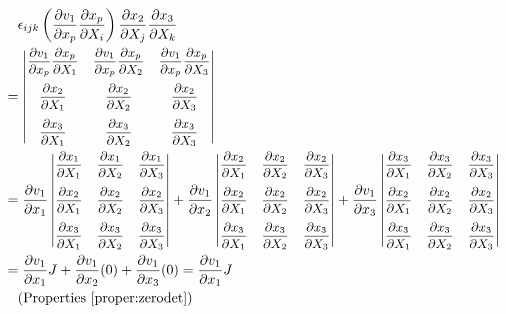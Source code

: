 \begin{align*}
&\quad\epsilon_{ijk} \left(\frac{\partial v_1}{\partial x_p}\frac{\partial x_p}{\partial X_i}\right)\frac{\partial x_2}{\partial X_j}\frac{\partial x_3}{\partial X_k} \\
&= \small\begin{vmatrix}
\dfrac{\partial v_1}{\partial x_p}\dfrac{\partial x_p}{\partial X_1} & \dfrac{\partial v_1}{\partial x_p}\dfrac{\partial x_p}{\partial X_2} & \dfrac{\partial v_1}{\partial x_p}\dfrac{\partial x_p}{\partial X_3} \\[10pt]
\dfrac{\partial x_2}{\partial X_1} & \dfrac{\partial x_2}{\partial X_2} & \dfrac{\partial x_2}{\partial X_3} \\[10pt]
\dfrac{\partial x_3}{\partial X_1} & \dfrac{\partial x_3}{\partial X_2} & \dfrac{\partial x_3}{\partial X_3} 
\end{vmatrix} \\
&= \frac{\partial v_1}{\partial x_1}\small\begin{vmatrix}
\dfrac{\partial x_1}{\partial X_1} & \dfrac{\partial x_1}{\partial X_2} & \dfrac{\partial x_1}{\partial X_3} \\[10pt]
\dfrac{\partial x_2}{\partial X_1} & \dfrac{\partial x_2}{\partial X_2} & \dfrac{\partial x_2}{\partial X_3} \\[10pt]
\dfrac{\partial x_3}{\partial X_1} & \dfrac{\partial x_3}{\partial X_2} & \dfrac{\partial x_3}{\partial X_3} 
\end{vmatrix} +
\frac{\partial v_1}{\partial x_2}\small\begin{vmatrix}
\dfrac{\partial x_2}{\partial X_1} & \dfrac{\partial x_2}{\partial X_2} & \dfrac{\partial x_2}{\partial X_3} \\[10pt]
\dfrac{\partial x_2}{\partial X_1} & \dfrac{\partial x_2}{\partial X_2} & \dfrac{\partial x_2}{\partial X_3} \\[10pt]
\dfrac{\partial x_3}{\partial X_1} & \dfrac{\partial x_3}{\partial X_2} & \dfrac{\partial x_3}{\partial X_3} 
\end{vmatrix} +
\frac{\partial v_1}{\partial x_3}\small\begin{vmatrix}
\dfrac{\partial x_3}{\partial X_1} & \dfrac{\partial x_3}{\partial X_2} & \dfrac{\partial x_3}{\partial X_3} \\[10pt]
\dfrac{\partial x_2}{\partial X_1} & \dfrac{\partial x_2}{\partial X_2} & \dfrac{\partial x_2}{\partial X_3} \\[10pt]
\dfrac{\partial x_3}{\partial X_1} & \dfrac{\partial x_3}{\partial X_2} & \dfrac{\partial x_3}{\partial X_3} 
\end{vmatrix} \\
&= \frac{\partial v_1}{\partial x_1} J + \frac{\partial v_1}{\partial x_2}(0) + \frac{\partial v_1}{\partial x_3} (0) = \frac{\partial v_1}{\partial x_1} J \\
&\quad \text{(Properties \ref{proper:zerodet})}
\end{align*}
